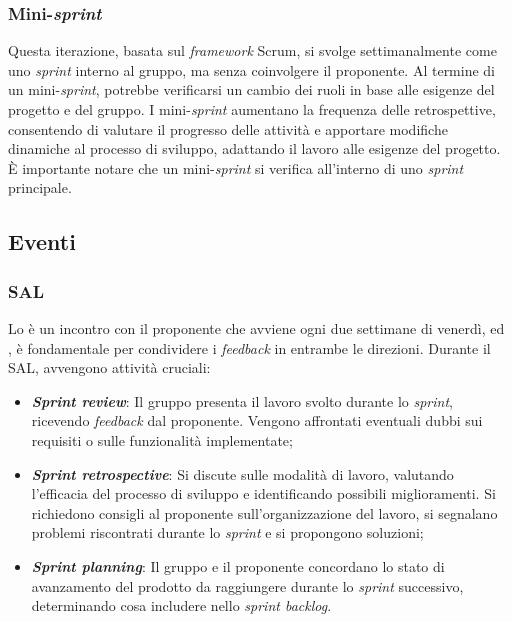 \subsubsection{Mini-\textit{sprint}}
Questa iterazione, basata sul \textit{framework} Scrum, si svolge settimanalmente 
come uno \textit{sprint} interno al gruppo, ma senza coinvolgere il proponente. 
Al termine di un mini-\textit{sprint}, potrebbe verificarsi un cambio dei ruoli 
in base alle esigenze del progetto e del gruppo. 
I mini-\textit{sprint} aumentano la frequenza delle retrospettive, consentendo 
di valutare il progresso delle attività e apportare modifiche dinamiche al processo 
di sviluppo, adattando il lavoro alle esigenze del progetto. 
È importante notare che un mini-\textit{sprint} si verifica all'interno di uno 
\textit{sprint} principale.

\subsection{Eventi}

\subsubsection{SAL}
Lo \SAL{} è un incontro con il proponente che
avviene ogni due settimane di venerdì, ed , è fondamentale per condividere i 
\textit{feedback} in entrambe le direzioni. 
Durante il SAL, avvengono attività cruciali:

\begin{itemize}
	\item \textbf{\textit{Sprint review}}: Il gruppo presenta il lavoro svolto 
			durante lo \textit{sprint}, ricevendo \textit{feedback} dal proponente. 
			Vengono affrontati eventuali dubbi sui requisiti o sulle funzionalità implementate;
	
	\item \textbf{\textit{Sprint retrospective}}: Si discute sulle modalità di lavoro, 
			valutando l'efficacia del processo di sviluppo e identificando possibili miglioramenti. 
			Si richiedono consigli al proponente sull'organizzazione del lavoro, si segnalano 
			problemi riscontrati durante lo \textit{sprint} e si propongono soluzioni;

	\item \textbf{\textit{Sprint planning}}: Il gruppo e il proponente concordano lo stato 
			di avanzamento del prodotto da raggiungere durante lo \textit{sprint} successivo, 
			determinando cosa includere nello \textit{sprint backlog}.
\end{itemize}

